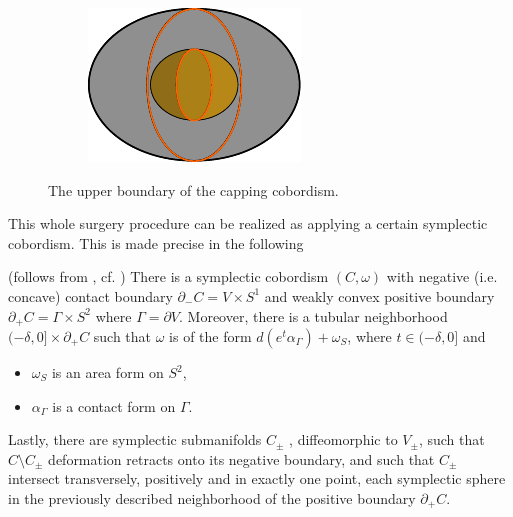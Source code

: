 \begin{figure}[ht]
\begin{subfigure}{.9\linewidth}
    \end{subfigure}
    \begin{subfigure}{.9\linewidth}
        \centering
        \includegraphics[trim=-.5cm -.5cm -.5cm -.5cm, width=.5\linewidth]{../images/gamma_times_s2.pdf}
    \end{subfigure}
    \caption[short]{The upper boundary of the capping cobordism.}
    \label{fig:cap_cobordism}
\end{figure}

This whole surgery procedure can be realized as applying a certain symplectic cobordism.
This is made precise in the following
\begin{lemma}(follows from \cite[Theorem 6.1]{MNW13}, cf. \cite[Lemma 6.1]{BGM22})\label{lem:capping_cobordism}
    There is a symplectic cobordism $(C, \omega)$ with negative (i.e. concave) 
    contact boundary $\partial_-C = V \times S^1$ and weakly convex positive boundary
    $\partial_+ C = \Gamma \times S^2$ where $\Gamma = \partial V$. 
    Moreover, there is a tubular neighborhood $(-\delta, 0] \times \partial_+ C$
    such that $\omega$ is of the form $d(e^t \alpha_\Gamma) + \omega_S$, 
    where $t \in (-\delta, 0]$ and 
    \begin{itemize}
        \item $\omega_S$ is an area form on $S^2$,
        \item $\alpha_\Gamma$ is a contact form on $\Gamma$.
    \end{itemize}
    Lastly, there are symplectic submanifolds $C_\pm$ , diffeomorphic to $V_\pm$, 
    such that $C\setminus C_\pm$ deformation retracts onto its negative boundary, 
    and such that $C_\pm$ intersect transversely, positively and in exactly one point, 
    each symplectic sphere in the previously described neighborhood 
    of the positive boundary $\partial_+ C$.
\end{lemma}

